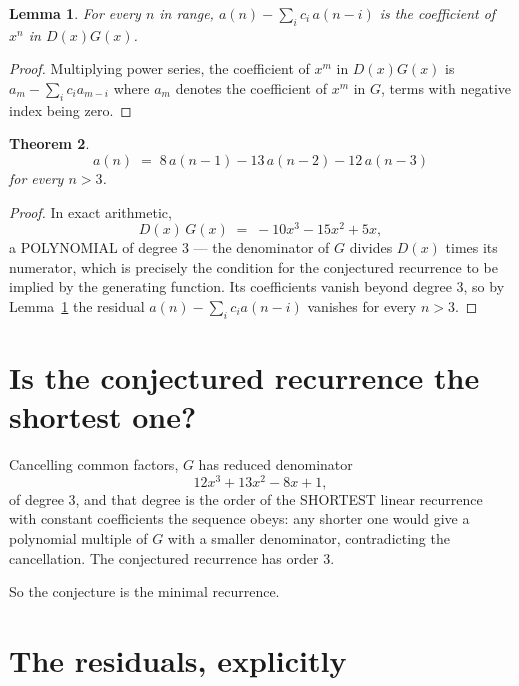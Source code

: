 \documentclass[11pt,a4paper]{article}
\theoremstyle{plain}
\newtheorem{theorem}{Theorem}
\newtheorem{lemma}[theorem]{Lemma}
\theoremstyle{definition}
\begin{document}
\begin{lemma}\label{lem:key}
For every $n$ in range, $a(n)-\sum_i c_i\,a(n-i)$ is the coefficient of $x^{n}$ in
$D(x)G(x)$.
\end{lemma}

\begin{proof}
Multiplying power series, the coefficient of $x^{m}$ in $D(x)G(x)$ is
$a_m-\sum_i c_i a_{m-i}$ where $a_m$ denotes the coefficient of $x^{m}$ in $G$, terms with
negative index being zero.
\end{proof}

\begin{theorem}
\[
a(n)\;=\;8\,a(n-1) - 13\,a(n-2) - 12\,a(n-3)
\]
for every $n>3$.
\end{theorem}

\begin{proof}
In exact arithmetic,
\[
D(x)\,G(x)\;=\;- 10 x^{3} - 15 x^{2} + 5 x,
\]
a POLYNOMIAL of degree $3$ --- the denominator of $G$ divides $D(x)$ times its numerator,
which is precisely the condition for the conjectured recurrence to be implied by the
generating function. Its coefficients vanish beyond degree $3$, so by
Lemma~\ref{lem:key} the residual $a(n)-\sum_ic_ia(n-i)$ vanishes for every
$n>3$.
\end{proof}

\section{Is the conjectured recurrence the shortest one?}

Cancelling common factors, $G$ has reduced denominator
\[
12 x^{3} + 13 x^{2} - 8 x + 1,
\]
of degree $3$, and that degree is the order of the SHORTEST linear recurrence with
constant coefficients the sequence obeys: any shorter one would give a polynomial multiple of
$G$ with a smaller denominator, contradicting the cancellation. The conjectured recurrence has
order $3$.

So the conjecture is the minimal recurrence.

\section{The residuals, explicitly}
\end{document}
